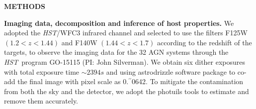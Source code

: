 \documentclass{natureprintstyle}
\newcommand{\hst}{{\it HST}}
\newcommand{\mbh}{$\mathcal M_{\rm BH}$}
\newcommand{\halpha}{${\it H}\alpha$}
\newcommand{\hbeta}{${\it H}\beta$}
\newcommand{\Mgii}{Mg$_{\rm II}$}
\newcommand{\Civ}{C$_{\rm IV}$}
\newcommand{\farcs}{\mbox{\ensuremath{.\!\!^{\prime\prime}}}}%
\begin{document}

\begin{center}
{\bf \Large \uppercase{Methods} }
\end{center}


\textbf{Imaging data, decomposition and inference of host properties.} 
We adopted the \hst/WFC3 infrared channel and selected to use the filters F125W $(1.2<z<1.44)$ and F140W $(1.44<z<1.7)$ according to the redshift of the targets, to observe the imaging data for the 32 AGN systems through the \hst\ program GO-15115 (PI: John Silverman). We obtain six dither exposures with total exposure time $\sim2394s$ and using  {\sc astrodrizzle} software package to co-add the final image with pixel scale as 0\farcs0642. To mitigate the contamination from both the sky and the detector, we adopt the {\sc photuils} tools to estimate and remove them accurately.
\end{document}
